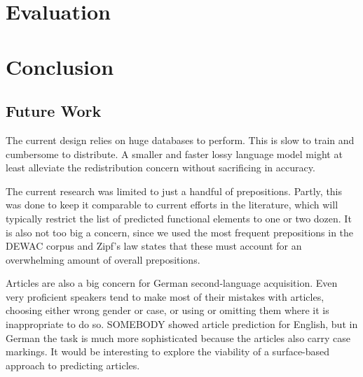 \documentclass[draft,12pt]{article}
\begin{document}
\section{Evaluation}

\section{Conclusion}

\subsection{Future Work}

The current design relies on huge databases to perform. This is slow to train
and cumbersome to distribute. A smaller and faster lossy language model might at
least alleviate the redistribution concern without sacrificing in accuracy.

The current research was limited to just a handful of prepositions. Partly, this
was done to keep it comparable to current efforts in the literature, which will
typically restrict the list of predicted functional elements to one or two
dozen. It is also not too big a concern, since we used the most frequent
prepositions in the DEWAC corpus and Zipf's law %
states that these must account for an overwhelming amount of overall
prepositions. %

Articles are also a big concern for German second-language acquisition. Even
very proficient speakers tend to make most of their mistakes with articles,
choosing either wrong gender or case, or using or omitting them where it is
inappropriate to do so. SOMEBODY %
showed article prediction for English, but in German the task is much more
sophisticated because the articles also carry case markings. It would be
interesting to explore the viability of a surface-based approach to predicting
articles.


\end{document}
